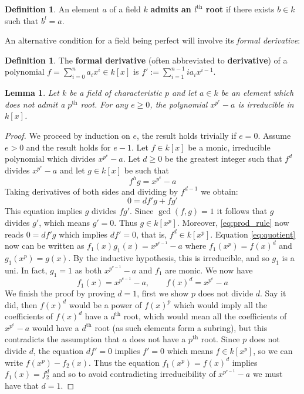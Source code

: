 \documentclass[12pt]{article}
\theoremstyle{plain}
\newtheorem{lemma}[thm]{Lemma}
\theoremstyle{definition}
\newtheorem{defn}[thm]{Definition} %
\begin{document}
	\begin{defn}
		\label{def:pthroot}
		An element $a$ of a field $k$ \textbf{admits an $l^{\operatorname{th}}$ root} if there exists $b \in k$ such that $b^l = a$.
	\end{defn}
	An alternative condition for a field being perfect will involve its \emph{formal derivative}:
	\begin{defn}
		The \textbf{formal derivative} (often abbreviated to \textbf{derivative}) of a polynomial $f = \sum_{i = 0}^n a_i x^i \in k[x]$ is $f' := \sum_{i = 1}^{n-1} ia_ix^{i-1}$.
	\end{defn}
	\begin{lemma}
		\label{lem:irred_example}
		Let $k$ be a field of characteristic $p$ and let $a \in k$ be an element which does not admit a $p^\text{th}$ root. For any $e \geq 0$, the polynomial $x^{p^e} - a$ is irreducible in $k[x]$.
	\end{lemma}
	\begin{proof}
		We proceed by induction on $e$, the result holds trivially if $e = 0$. Assume $e > 0$ and the result holds for $e-1$. Let $f \in k[x]$ be a monic, irreducible polynomial which divides $x^{p^e} - a$. Let $d \geq 0$ be the greatest integer such that $f^d$ divides $x^{p^e} - a$ and let $g \in k[x]$ be such that 
		\begin{equation}
			\label{eq:quotient}
			f^h g = x^{p^e} - a
		\end{equation}
		Taking derivatives of both sides and dividing by $f^{d-1}$ we obtain:
		\begin{equation}
			\label{eq:prod_rule}
			0 = df'g + fg'
		\end{equation}
		This equation implies $g$ divides $fg'$. Since $\operatorname{gcd}(f,g) = 1$ it follows that $g$ divides $g'$, which means $g' = 0$. Thus $g \in k[x^p]$. Moreover, \eqref{eq:prod_rule} now reads $0 = df'g$ which implies $df' = 0$, that is, $f^d \in k[x^p]$. Equation \eqref{eq:quotient} now can be written as $f_1(x)g_1(x) = x^{p^{e-1}} - a$ where $f_1(x^p) = f(x)^d$ and $g_1(x^p) = g(x)$. By the inductive hypothesis, this is irreducible, and so $g_1$ is a uni. In fact, $g_1 = 1$ as both $x^{p^{e-1}} - a$ and $f_1$ are monic. We now have \[f_1(x) = x^{p^{e-1}} - a,\qquad f(x)^d = x^{p^e} - a\]
		We finish the proof by proving $d = 1$, first we show $p$ does not divide $d$. Say it did, then $f(x)^d$ would be a power of $f(x)^p$ which would imply all the coefficients of $f(x)^d$ have a $d^{\operatorname{th}}$ root, which would mean all the coefficients of $x^{p^e} - a$ would have a $d^{\operatorname{th}}$ root (as such elements form a subring), but this contradicts the assumption that $a$ does not have a $p^{\operatorname{th}}$ root. Since $p$ does not divide $d$, the equation $df' = 0$ implies $f' = 0$ which means $f \in k[x^p]$, so we can write $f(x^p) - f_2(x)$. Thus the equation $f_1(x^p) = f(x)^d$ implies $f_1(x) = f_2^d$ and so to avoid contradicting irreducibility of $x^{p^{e-1}}-a$ we must have that $d = 1$.
	\end{proof}
\end{document}
